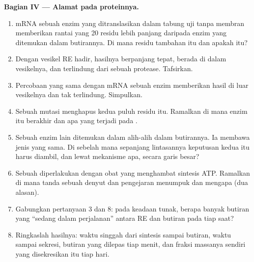 \begin{problem}
\medskip
\noindent\textbf{Bagian IV --- Alamat pada proteinnya.}
\begin{enumerate}[resume]
  \item mRNA sebuah enzim yang ditranslasikan dalam tabung uji tanpa
        membran memberikan rantai yang \qty{20}{} residu lebih panjang
        daripada enzim yang ditemukan dalam butirannya. Di mana residu
        tambahan itu dan apakah itu?
  \item Dengan vesikel RE hadir, hasilnya berpanjang tepat, berada di
        dalam vesikelnya, dan terlindung dari sebuah protease.
        Tafsirkan.
  \item Percobaan yang sama dengan mRNA sebuah enzim 
        memberikan hasil di luar vesikelnya dan tak terlindung.
        Simpulkan.
  \item Sebuah mutasi menghapus kedua puluh residu itu. Ramalkan di
        mana enzim itu berakhir dan apa yang terjadi pada .
  \item Sebuah enzim lain ditemukan dalam  alih-alih dalam
        butirannya. Ia membawa jenis  yang sama. Di
        sebelah mana sepanjang lintasannya keputusan kedua itu harus
        diambil, dan lewat mekanisme apa, secara garis besar?
  \item Sebuah  diperlakukan dengan obat yang menghambat sintesis
        ATP. Ramalkan di mana tanda sebuah denyut dan pengejaran
        menumpuk dan mengapa (dua alasan).
  \item Gabungkan pertanyaan 3 dan 8: pada keadaan tunak, berapa banyak
        butiran yang ``sedang dalam perjalanan'' antara RE dan butiran
        pada tiap saat?
  \item Ringkaslah hasilnya: waktu singgah dari sintesis sampai
        butiran, waktu sampai sekresi, butiran yang dilepas tiap menit,
        dan fraksi massanya sendiri yang disekresikan  itu tiap hari.
\end{enumerate}
\end{problem}
